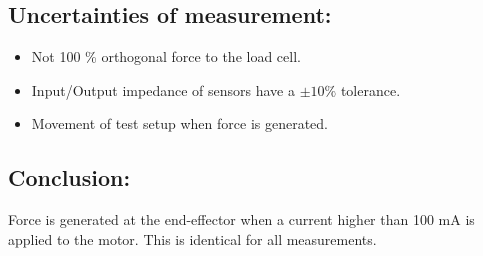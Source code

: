 \subsection*{Uncertainties of measurement:}
\begin{itemize}
\item Not 100 \% orthogonal force to the load cell.
\item Input/Output impedance of sensors have a $\pm 10 \%$ tolerance.
\item Movement of test setup when force is generated.
\end{itemize}

\subsection*{Conclusion:}
Force is generated at the end-effector when a current higher than 100 mA is applied to the motor. This is identical for all measurements. 
